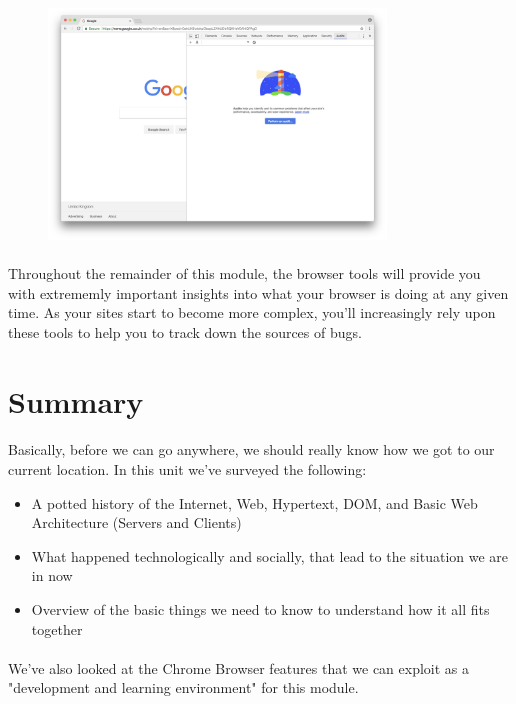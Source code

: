 \documentclass[12pt, a4paper, oneside]{book}
\begin{document}
\begin{figure}[H]
\centering
\includegraphics[width=0.8\textwidth]{figures/devtools-audits.png}
\label{fig:devtools-audits}
\end{figure}

\paragraph{} Throughout the remainder of this module, the browser tools will provide you with extrememly important insights into what your browser is doing at any given time. As your sites start to become more complex, you'll increasingly rely upon these tools to help you to track down the sources of bugs.


\section{Summary}
\paragraph{} Basically, before we can go anywhere, we should really know how we got to our current location. In this unit we've surveyed the following:

\begin{itemize}
\item A potted history of the Internet, Web, Hypertext, DOM, and Basic Web Architecture (Servers and Clients)
\item What happened technologically and socially, that lead to the situation we are in now
\item Overview of the basic things we need to know to understand how it all fits together
\end{itemize}

\paragraph{} We've also looked at the Chrome Browser features that we can exploit as a "development and learning environment" for this module.
\end{document}
